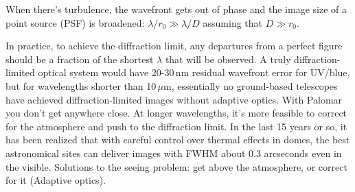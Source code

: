 \documentclass[12pt, letterpaper, preprint]{aastex}
\begin{document}
\begin{enumerate}
When there's turbulence, the wavefront gets out of phase and
the image size of a point source (PSF) is broadened: $\lambda/r_0 \gg \lambda / D$ assuming that $ D \gg r_0$. 

In practice, to achieve the diffraction limit, any departures from a perfect figure should be a fraction of the shortest $\lambda$ that will be observed. A truly diffraction-limited optical system would have 20-30\,nm residual wavefront error for UV/blue, but
for wavelengths shorter than 10\,$\mu$m, essentially no ground-based telescopes have achieved diffraction-limited images without adaptive optics. With Palomar you don't get anywhere close. At longer wavelengths, it's more feasible to correct for the atmosphere and push to the diffraction limit.
In the last 15 years or so, it has been realized that with careful control over thermal effects in domes, the best astronomical sites can deliver images with FWHM about 0.3 arcseconds even in the visible.
Solutions to the seeing problem: get above the atmosphere, or correct for it (Adaptive optics). 

\end{enumerate}
\end{document}
